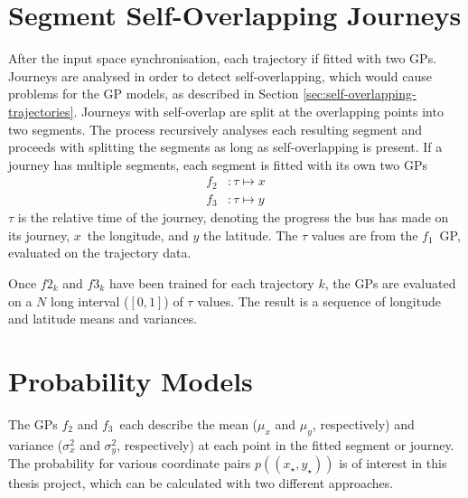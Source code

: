 \section{Segment Self-Overlapping Journeys} \label{sec:segment-self-overlapping-journeys}
After the input space synchronisation, each trajectory if fitted with two GPs.
Journeys are analysed in order to detect self-overlapping, which would cause problems for the GP models, as described in Section \ref{sec:self-overlapping-trajectories}.
Journeys with self-overlap are split at the overlapping points into two segments.
The process recursively analyses each resulting segment and proceeds with splitting the segments as long as self-overlapping is present.
If a journey has multiple segments, each segment is fitted with its own two GPs
\begin{align}
    f_2&: \tau \longmapsto x \\
    f_3&: \tau \longmapsto y
\end{align}
$\tau$ is the relative time of the journey, denoting the progress the bus has made on its journey, $x$ the longitude, and $y$ the latitude.
The $\tau$ values are from the $f_1$ GP, evaluated on the trajectory data.

Once $f2_k$ and $f3_k$ have been trained for each trajectory $k$, the GPs are evaluated on a $N$ long interval ($[0,1]$) of $\tau$ values.
The result is a sequence of longitude and latitude means and variances.

\section{Probability Models}
The GPs $f_2$ and $f_3$ each describe the mean ($\mu_x$ and $\mu_y$, respectively) and variance ($\sigma_x^2$ and $\sigma_y^2$, respectively) at each point in the fitted segment or journey.
The probability for various coordinate pairs $p((x_\star,y_\star))$ is of interest in this thesis project, which can be calculated with two different approaches.

